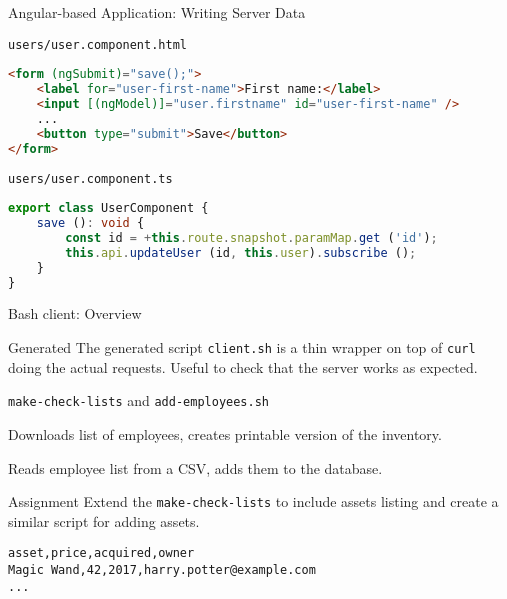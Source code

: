 \begin{frame}[fragile]{Angular-based Application: Writing Server Data}
    \begin{block}{\lstinline{users/user.component.html}}
\begin{lstlisting}[language=html,style=mini]
<form (ngSubmit)="save();">
    <label for="user-first-name">First name:</label>
    <input [(ngModel)]="user.firstname" id="user-first-name" />
    ...
    <button type="submit">Save</button>
</form>
\end{lstlisting}
    \end{block}

    \begin{block}{\lstinline{users/user.component.ts}}
\begin{lstlisting}[language=typescript,style=mini]
export class UserComponent {
    save (): void {
        const id = +this.route.snapshot.paramMap.get ('id');
        this.api.updateUser (id, this.user).subscribe ();
    }
}
\end{lstlisting}
    \end{block}
\end{frame}


\begin{frame}[fragile]{Bash client: Overview}
    \begin{block}{Generated}
        The generated script \lstinline{client.sh} is a thin wrapper on top of \lstinline{curl} doing the actual requests. Useful to check that the server works as expected.
    \end{block}

    \begin{block}{\lstinline{make-check-lists} and \lstinline{add-employees.sh}}

        Downloads list of employees, creates printable version of the inventory.

        Reads employee list from a CSV, adds them to the database.
    \end{block}

    \begin{block}{Assignment}
        Extend the \lstinline{make-check-lists} to include assets listing and create a similar script for adding assets.

\begin{lstlisting}
asset,price,acquired,owner
Magic Wand,42,2017,harry.potter@example.com
...
\end{lstlisting}
    \end{block}
\end{frame}


